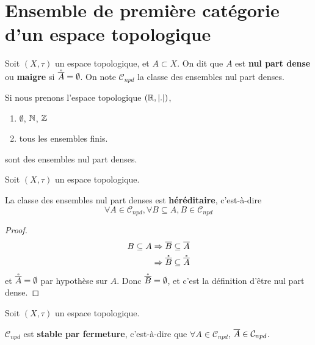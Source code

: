 \chapter{Ensemble de première catégorie d'un espace topologique}

\begin{definition} 
	Soit $(X, \tau)$ un espace topologique, et $A \subset X$. On dit que $A$ est
	\textbf{nul part dense} ou \textbf{maigre} si $\mathring{\overline{A}} =
	\emptyset$. On note $\mathcal{C}_{npd}$ la classe des ensembles nul part
	denses.
\end{definition}

\begin{exemple}
	Si nous prenons l'espace topologique $(\mathbb{R}, \abs{.})$,
	\begin{enumerate}
		\item $\emptyset$, $\mathbb{N}$, $\mathbb{Z}$
		\item tous les ensembles finis.
	\end{enumerate}
	sont des ensembles nul part denses.
\end{exemple}

\begin{proposition}
	Soit $(X, \tau)$ un espace topologique.

	La classe des ensembles nul part denses est \textbf{héréditaire},
	c'est-à-dire
	\begin{equation}
		\forall A \in \mathcal{C}_{npd}, \forall B \subseteq A,
		B \in \mathcal{C}_{npd}
	\end{equation}
\end{proposition}

\ifdefined\outputproof
\begin{proof}
	\begin{align}
		B \subseteq A & \Rightarrow \overline{B} \subseteq \overline{A} \\
		& \Rightarrow \mathring{\overline{B}} \subseteq \mathring{\overline{A}}
	\end{align}
	et $\mathring{\overline{A}}= \emptyset$ par
	hypothèse sur $A$. Donc $\mathring{\overline{B}} = \emptyset$, et c'est la définition
	d'être nul part dense.
\end{proof}
\fi

\begin{proposition}
	Soit $(X, \tau)$ un espace topologique.

	$\mathcal{C}_{npd}$ est \textbf{stable par fermeture}, c'est-à-dire que
	$\forall A \in \mathcal{C}_{npd}$, $\overline{A} \in \mathcal{C}_{npd}$.
\end{proposition}


